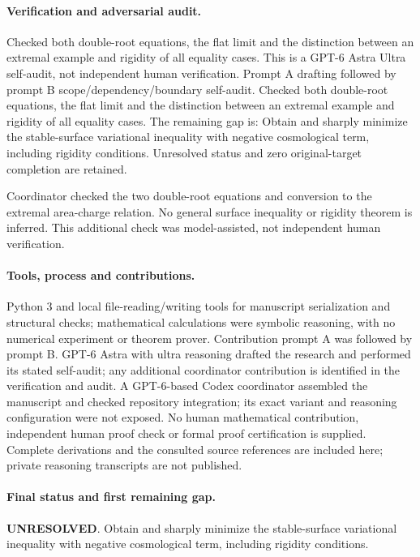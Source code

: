 \documentclass[11pt]{article}
\begin{document}
\paragraph{Verification and adversarial audit.}
Checked both double-root equations, the flat limit and the distinction between an extremal example and rigidity of all equality cases. This is a GPT-6 Astra Ultra self-audit, not independent human verification. Prompt A drafting followed by prompt B scope/dependency/boundary self-audit. Checked both double-root equations, the flat limit and the distinction between an extremal example and rigidity of all equality cases. The remaining gap is: Obtain and sharply minimize the stable-surface variational inequality with negative cosmological term, including rigidity conditions. Unresolved status and zero original-target completion are retained.

Coordinator checked the two double-root equations and conversion to the extremal area-charge relation. No general surface inequality or rigidity theorem is inferred. This additional check was model-assisted, not independent human verification.

\paragraph{Tools, process and contributions.}
Python 3 and local file-reading/writing tools for manuscript serialization and structural checks; mathematical calculations were symbolic reasoning, with no numerical experiment or theorem prover. Contribution prompt A was followed by prompt B. GPT-6 Astra with ultra reasoning drafted the research and performed its stated self-audit; any additional coordinator contribution is identified in the verification and audit. A GPT-6-based Codex coordinator assembled the manuscript and checked repository integration; its exact variant and reasoning configuration were not exposed. No human mathematical contribution, independent human proof check or formal proof certification is supplied. Complete derivations and the consulted source references are included here; private reasoning transcripts are not published.

\paragraph{Final status and first remaining gap.}
\textbf{UNRESOLVED}. Obtain and sharply minimize the stable-surface variational inequality with negative cosmological term, including rigidity conditions.
\end{document}
